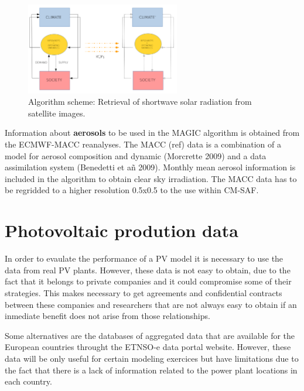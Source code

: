 \begin{figure}
  \centering
  \includegraphics[width=0.6\textwidth]{figs/esquema}
  \caption{Algorithm scheme: Retrieval of shortwave solar radiation from satellite images.}
 \label{fig:algorithm}
\end{figure}

Information about \textbf{aerosols} to be used in the MAGIC algorithm is obtained from the ECMWF-MACC reanalyses. The MACC (ref) data is a combination of a model for aerosol composition and dynamic (Morcrette 2009) and a data assimilation system (Benedetti et añ 2009). Monthly mean aerosol information is included in the algorithm to obtain clear sky irradiation. The MACC data has to be regridded to a higher resolution 0.5x0.5 to the use within CM-SAF.


\section{Photovoltaic prodution data}

In order to evaulate the performance of a PV model it is necessary to use the data from real PV plants. However, these data is not easy to obtain, due to the fact that it belongs to private companies and it could compromise some of their strategies. This makes necessary to get agreements and confidential contracts between these companies and researchers that are not always easy to obtain if an inmediate benefit does not arise from those relationships.

Some alternatives are the databases of aggregated data that are available for the European countries throught the ETNSO-e data portal website. However, these data will be only useful for certain modeling exercices but have limitations due to the fact that there is a lack of information related to the power plant locations in each country.

